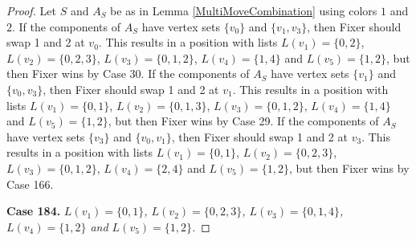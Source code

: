 \documentclass[12pt]{amsart}
\theoremstyle{plain}
\theoremstyle{definition}
\theoremstyle{remark}
\begin{document}
\begin{proof}
Let $S$ and $A_S$ be as in Lemma \ref{MultiMoveCombination} using colors $1$ and $2$. If the components of $A_S$ have vertex sets $\{v_0\}$ and $\{v_1, v_3\}$, then Fixer should swap 1 and 2 at $v_0$. This results in a position with lists $L(v_1) = \{0, 2\}$, $L(v_2) = \{0, 2, 3\}$, $L(v_3) = \{0, 1, 2\}$, $L(v_4) = \{1, 4\}$ and $L(v_5) = \{1, 2\}$, but then Fixer wins by Case 30.
If the components of $A_S$ have vertex sets $\{v_1\}$ and $\{v_0, v_3\}$, then Fixer should swap 1 and 2 at $v_1$. This results in a position with lists $L(v_1) = \{0, 1\}$, $L(v_2) = \{0, 1, 3\}$, $L(v_3) = \{0, 1, 2\}$, $L(v_4) = \{1, 4\}$ and $L(v_5) = \{1, 2\}$, but then Fixer wins by Case 29.
If the components of $A_S$ have vertex sets $\{v_3\}$ and $\{v_0, v_1\}$, then Fixer should swap 1 and 2 at $v_3$. This results in a position with lists $L(v_1) = \{0, 1\}$, $L(v_2) = \{0, 2, 3\}$, $L(v_3) = \{0, 1, 2\}$, $L(v_4) = \{2, 4\}$ and $L(v_5) = \{1, 2\}$, but then Fixer wins by Case 166.

\noindent\textbf{Case 184.  }\textit{$L(v_1) = \{0, 1\}$, $L(v_2) = \{0, 2, 3\}$, $L(v_3) = \{0, 1, 4\}$, $L(v_4) = \{1, 2\}$ and $L(v_5) = \{1, 2\}$.}


\end{proof}
\end{document}

